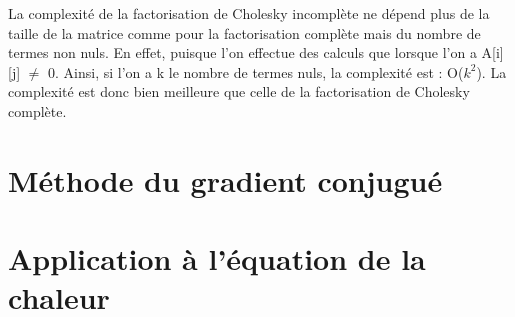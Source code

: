 \documentclass{article}
\begin{document}
La complexité de la factorisation de Cholesky incomplète ne dépend plus de la taille de la matrice comme pour la factorisation complète mais du nombre de termes non nuls. En effet, puisque l'on effectue des calculs que lorsque l'on a A[i][j] $\ne$ 0.
Ainsi, si l'on a k le nombre de termes nuls, la complexité est : O($k^2$). La complexité est donc bien meilleure que celle de la factorisation de Cholesky complète.

\section{Méthode du gradient conjugué}
\label{sec:meth_grad_conj}

\section{Application à l'équation de la chaleur}
\label{sec:eq_chaleur}
\end{document}
